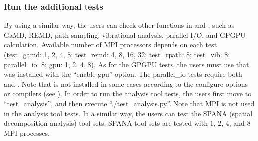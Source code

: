 \documentclass[a4paper,11pt,oneside,english]{sphinxmanual}
\begin{document}
\subsubsection{Run the additional tests}
\label{\detokenize{01_Getting_Started:run-the-additional-tests}}
By using a similar way, the users can check other functions in  and ,
such as GaMD, REMD, path sampling, vibrational analysis, parallel I/O, and GPGPU calculation.
Available number of MPI processors depends on each test (test\_gamd: 1, 2, 4, 8;
test\_remd: 4, 8, 16, 32; test\_rpath: 8; test\_vib: 8; parallel\_io: 8; gpu: 1, 2, 4, 8).
As for the GPGPU tests, the users must use  that was installed with the “\textendash{}enable-gpu” option.
The parallel\_io tests require both  and .
Note that  is not installed in some cases according to the configure options or compilers (see {\hyperref[\detokenize{01_Getting_Started:advanced-installation}]{}}).
In order to run the analysis tool tests, the users first move to “test\_analysis”,
and then execute “./test\_analysis.py”. Note that MPI is not used in the analysis tool tests.
In a similar way, the users can test the SPANA (spatial decomposition analysis) tool sets.
SPANA tool sets are tested with 1, 2, 4, and 8 MPI processes.
\end{document}
